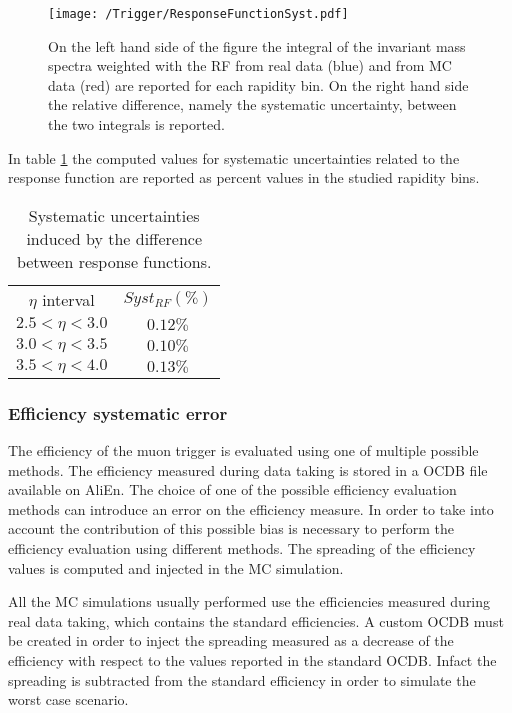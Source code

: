 \begin{figure}[!h]
\begin{center}
  \texttt{[image: /Trigger/ResponseFunctionSyst.pdf]}
\end{center} 
\caption{\label{fig:RFSyst} On the left hand side of the figure the integral of the invariant mass spectra weighted with the RF from real data (blue) and from MC data (red) are reported for each rapidity bin. On the right hand side the relative difference, namely the systematic uncertainty, between the two integrals is reported.}
\end{figure}

In table \ref{tab:systRF} the computed values for systematic uncertainties related to the response function are reported as percent values in the studied rapidity bins.

\begin{table}[!htb]
\centering
\begin{tabular}{ |c|c| }
 \hline
 $\eta$ interval&  $Syst_{RF} (\%)$  \\
 \hhline{|=|=|}
 $2.5<\eta<3.0$&  $0.12\%$  \\
 \hline
 $3.0<\eta<3.5$&  $0.10\%$  \\
 \hline
 $3.5<\eta<4.0$&  $0.13\%$  \\
 \hline
\end{tabular}
\caption{Systematic uncertainties induced by the difference between response functions.}
\label{tab:systRF}
\end{table}

\subsubsection{Efficiency systematic error}\label{sec:effsyst}
The efficiency of the muon trigger is evaluated using one of multiple possible methods. The efficiency measured during data taking is stored in a OCDB file available on AliEn. The choice of one of the possible efficiency evaluation methods can introduce an error on the efficiency measure. In order to take into account the contribution of this possible bias is necessary to perform the efficiency evaluation using different methods. The spreading of the efficiency values is computed and injected in the MC simulation.

All the MC simulations usually performed use the efficiencies measured during real data taking, which contains the standard efficiencies. A custom OCDB must be created in order to inject the spreading measured as a decrease of the efficiency with respect to the values reported in the standard OCDB. Infact the spreading is subtracted from the standard efficiency in order to simulate the worst case scenario.

